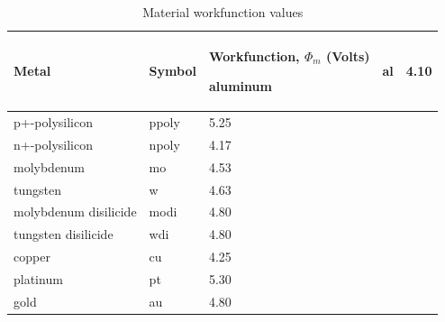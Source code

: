 



\small

\begin{longtable}[htbp]{|
>{\setlength{\hsize}{0.6\hsize}}Y|
>{\setlength{\hsize}{0.5\hsize}}Y|
>{\setlength{\hsize}{0.5\hsize}}Y|} 

  \caption[Material workfunction values]{Material workfunction values
    \label{workFuncTable}}
\\
\hline

\color{white} \bf Metal &
\color{white} \bf Symbol &
\color{white} \bf Workfunction, $\Phi_m$ (Volts) \endhead \hline 

   aluminum               &  al             &  4.10   \\ \hline
   p+-polysilicon         &  ppoly          &  5.25   \\ \hline
   n+-polysilicon         &  npoly          &  4.17   \\ \hline
   molybdenum             &  mo             &  4.53   \\ \hline
   tungsten               &  w              &  4.63   \\ \hline
   molybdenum disilicide  &  modi           &  4.80   \\ \hline
   tungsten disilicide    &  wdi            &  4.80   \\ \hline
   copper                 &  cu             &  4.25   \\ \hline
   platinum               &  pt             &  5.30   \\ \hline
   gold                   &  au             &  4.80   \\ \hline


\end{longtable}


